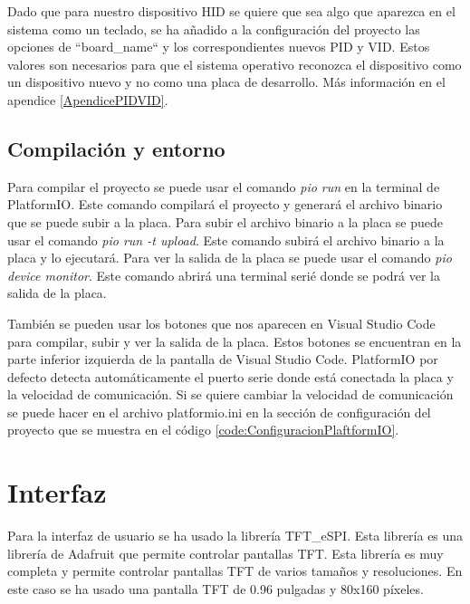 \begin{tcolorbox}[colback=blue!5!white, colframe=blue!55!white, title=Nota]
    Dado que para nuestro dispositivo \gls{HID} se quiere que sea algo que aparezca en el sistema como un teclado, se ha añadido a la configuración del proyecto las opciones de ``board\_name`` y los correspondientes nuevos \gls{PID} y \gls{VID}. Estos valores son necesarios para que el sistema operativo reconozca el dispositivo como un dispositivo nuevo y no como una placa de desarrollo. Más información en el apendice \ref{ApendicePIDVID}.
\end{tcolorbox}

\subsection{Compilación y entorno}

Para compilar el proyecto se puede usar el comando \textit{pio run} en la terminal de \gls{PlatformIO}. Este comando compilará el proyecto y generará el archivo binario que se puede subir a la placa. Para subir el archivo binario a la placa se puede usar el comando \textit{pio run -t upload}. Este comando subirá el archivo binario a la placa y lo ejecutará. Para ver la salida de la placa se puede usar el comando \textit{pio device monitor}. Este comando abrirá una terminal serié donde se podrá ver la salida de la placa.

También se pueden usar los botones que nos aparecen en Visual Studio Code para compilar, subir y ver la salida de la placa. Estos botones se encuentran en la parte inferior izquierda de la pantalla de Visual Studio Code. \gls{PlatformIO} por defecto detecta automáticamente el puerto serie donde está conectada la placa y la velocidad de comunicación. Si se quiere cambiar la velocidad de comunicación se puede hacer en el archivo platformio.ini en la sección de configuración del proyecto que se muestra en el código \ref{code:ConfiguracionPlaftformIO}.


\section{Interfaz}

Para la interfaz de usuario se ha usado la librería TFT\_eSPI. Esta librería es una librería de Adafruit que permite controlar pantallas \gls{TFT}. Esta librería es muy completa y permite controlar pantallas \gls{TFT} de varios tamaños y resoluciones. En este caso se ha usado una pantalla \gls{TFT} de 0.96 pulgadas y 80x160 píxeles.

